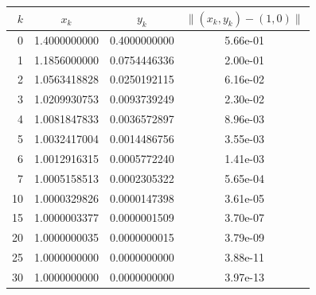 \begin{tabular}{r c c c}
\toprule
$k$ & $x_k$ & $y_k$ & $\|(x_k,y_k)-(1,0)\|$\\
\midrule
0 & 1.4000000000 & 0.4000000000 & 5.66e-01\\
1 & 1.1856000000 & 0.0754446336 & 2.00e-01\\
2 & 1.0563418828 & 0.0250192115 & 6.16e-02\\
3 & 1.0209930753 & 0.0093739249 & 2.30e-02\\
4 & 1.0081847833 & 0.0036572897 & 8.96e-03\\
5 & 1.0032417004 & 0.0014486756 & 3.55e-03\\
6 & 1.0012916315 & 0.0005772240 & 1.41e-03\\
7 & 1.0005158513 & 0.0002305322 & 5.65e-04\\
10 & 1.0000329826 & 0.0000147398 & 3.61e-05\\
15 & 1.0000003377 & 0.0000001509 & 3.70e-07\\
20 & 1.0000000035 & 0.0000000015 & 3.79e-09\\
25 & 1.0000000000 & 0.0000000000 & 3.88e-11\\
30 & 1.0000000000 & 0.0000000000 & 3.97e-13\\
\bottomrule
\end{tabular}
